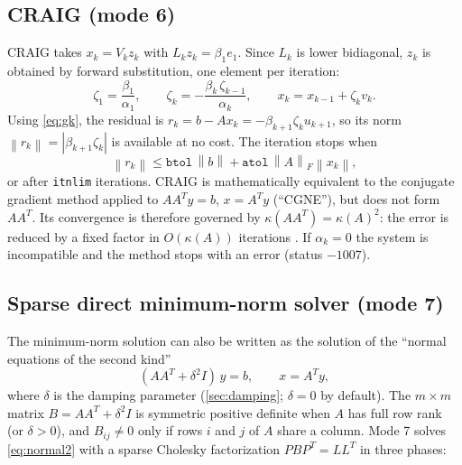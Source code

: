 \documentclass[11pt]{article}
\newcommand{\norm}[1]{\left\lVert #1 \right\rVert}
\newcommand{\code}[1]{\texttt{#1}}
\newcommand{\cond}{\kappa}
\begin{document}
\subsection{CRAIG (mode 6)}
\label{sec:craig}
CRAIG takes $x_k = V_k z_k$ with $L_k z_k = \beta_1 e_1$. Since $L_k$ is lower bidiagonal, $z_k$
is obtained by forward substitution, one element per iteration:
\begin{equation}
  \zeta_1 = \frac{\beta_1}{\alpha_1}, \qquad \zeta_k = -\frac{\beta_k\, \zeta_{k-1}}{\alpha_k},
  \qquad x_k = x_{k-1} + \zeta_k v_k .
\end{equation}
Using \cref{eq:gk}, the residual is
$r_k = b - A x_k = -\beta_{k+1} \zeta_k u_{k+1}$, so its norm $\norm{r_k} = |\beta_{k+1}\zeta_k|$
is available at no cost. The iteration stops when
\begin{equation}
  \norm{r_k} \le \code{btol}\,\norm{b} + \code{atol}\,\norm{A}_F \norm{x_k},
\end{equation}
or after \code{itnlim} iterations. CRAIG is mathematically equivalent to the conjugate gradient
method applied to $A A^T y = b$, $x = A^T y$ (``CGNE''), but does not form $A A^T$. Its convergence
is therefore governed by $\cond(A A^T) = \cond(A)^2$: the error is reduced by a fixed factor in
$O(\cond(A))$ iterations \cite{saunders1995}. If $\alpha_k = 0$ the system is incompatible and the
method stops with an error (status $-1007$).

\subsection{Sparse direct minimum-norm solver (mode 7)}
\label{sec:cholesky}
The minimum-norm solution can also be written as the solution of the ``normal equations of the
second kind''
\begin{equation}
  (A A^T + \delta^2 I)\, y = b, \qquad x = A^T y ,
  \label{eq:normal2}
\end{equation}
where $\delta$ is the damping parameter (\cref{sec:damping}; $\delta = 0$ by default). The
$m \times m$ matrix $B = A A^T + \delta^2 I$ is symmetric positive definite when $A$ has full row
rank (or $\delta > 0$), and $B_{ij} \neq 0$ only if rows $i$ and $j$ of $A$ share a column.
Mode 7 solves \cref{eq:normal2} with a sparse Cholesky factorization $P B P^T = L L^T$ in three phases:
\end{document}
